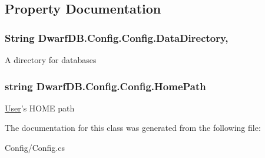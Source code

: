 \subsection{Property Documentation}
\hypertarget{class_dwarf_d_b_1_1_config_1_1_config_afcb080c4360c0c344d2b9d9ecb72c297}{
\subsubsection[{Data\+Directory}]{\setlength{\rightskip}{0pt plus 5cm}String Dwarf\+D\+B.\+Config.\+Config.\+Data\+Directory\hspace{0.3cm}{\ttfamily [get]}, {\ttfamily [set]}}}\label{class_dwarf_d_b_1_1_config_1_1_config_afcb080c4360c0c344d2b9d9ecb72c297}


A directory for databases 

\hypertarget{class_dwarf_d_b_1_1_config_1_1_config_a390a89963606ed0009489bfe8b46160d}{
\subsubsection[{Home\+Path}]{\setlength{\rightskip}{0pt plus 5cm}string Dwarf\+D\+B.\+Config.\+Config.\+Home\+Path\hspace{0.3cm}{\ttfamily [get]}}}\label{class_dwarf_d_b_1_1_config_1_1_config_a390a89963606ed0009489bfe8b46160d}


\hyperlink{namespace_dwarf_d_b_1_1_user}{User}'s H\+O\+M\+E path 



The documentation for this class was generated from the following file\+:\begin{DoxyCompactItemize}
\item 
Config/Config.\+cs\end{DoxyCompactItemize}
